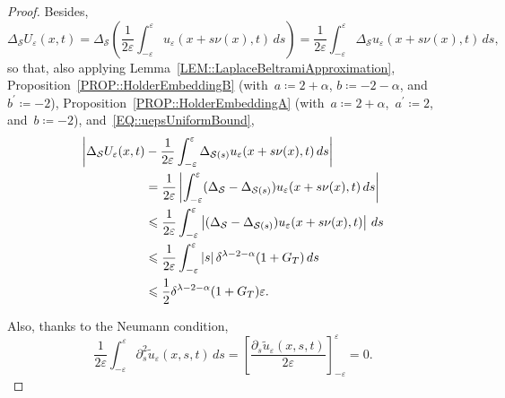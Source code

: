 \documentclass[12pt,a4paper]{amsart}
\makeatletter
\numberwithin{equation}{section}
\theoremstyle{definition}
\theoremstyle{remark}
\newcommand{\eps}{\varepsilon}
\newcommand{\abs}[1]{\left\lvert#1\right\rvert}
\renewcommand{\leq}{\leqslant}
\newcommand{\const}[1]{%
  \csname const@#1\endcsname%
}
\newcommand{\constapp}[1]{%
  \csname constapp@#1\endcsname%
}
\makeatother
\begin{document}
\begin{proof}
    Besides,
    \begin{equation}
        \Delta_\mathcal{S}U_\eps(x,t)= \Delta_\mathcal{S} \left(\frac{1}{2\eps}\int_{-\eps}^\eps u_\eps(x+s\nu(x),t)\,ds\right) = \frac{1}{2\eps}\int_{-\eps}^\eps \Delta_\mathcal{S}u_\eps(x+s\nu(x),t)\,ds,
    \end{equation}
    so that, also applying Lemma~\ref{LEM::LaplaceBeltramiApproximation}, Proposition~\ref{PROP::HolderEmbeddingB} (with~$a \coloneq 2+\alpha$, $b \coloneq -2-\alpha$, and~$b^\prime \coloneq -2$), Proposition~\ref{PROP::HolderEmbeddingA} (with~$a \coloneq 2+\alpha$,~$a^\prime \coloneq 2$, and~$b \coloneq -2$), and~\eqref{EQ::uepsUniformBound},
    \begin{equation}\label{EQ::uULaplaceBeltramiEstimate}
        \begin{split}
            \bigg|\Delta_\mathcal{S}U_\eps(x,t) &- \frac{1}{2\eps}\int_{-\eps}^\eps \Delta_{\mathcal{S}(s)}u_\eps(x+s\nu(x),t)\,ds\bigg|\\
                &= \frac{1}{2\eps}\abs{\int_{-\eps}^\eps (\Delta_\mathcal{S} - \Delta_{\mathcal{S}(s)})u_\eps(x+s\nu(x),t) \,ds}\\
                &\leq \frac{1}{2\eps}\int_{-\eps}^\eps \abs{(\Delta_\mathcal{S} - \Delta_{\mathcal{S}(s)})u_\eps(x+s\nu(x),t)}\,ds\\
                &\leq \frac{1}{2\eps}\int_{-\eps}^\eps \const{CONST::LaplaceBeltramiApproximation} \abs{s} \constapp{CONST::HolderEmbeddingA}\constapp{CONST::HolderEmbeddingB} \const{CONST::UniformRegularity} \delta^{\lambda-2-\alpha} (1+G_T)\,ds\\
                &\leq \frac{1}{2} \const{CONST::LaplaceBeltramiApproximation} \constapp{CONST::HolderEmbeddingA}\constapp{CONST::HolderEmbeddingB} \const{CONST::UniformRegularity} \delta^{\lambda-2-\alpha} (1+G_T)\eps.
        \end{split}
    \end{equation}

    Also, thanks to the Neumann condition,
    \begin{equation}\label{EQ::uUdnu2Estimate}
        \frac{1}{2\eps}\int_{-\eps}^\eps \partial_s^2 \tilde{u}_\eps(x,s,t)\,ds = {\left[\frac{\partial_s \tilde{u}_\eps(x,s,t)}{2\eps}\right]} _{-\eps}^{\eps} = 0.
    \end{equation}
    

\end{proof}
\end{document}
